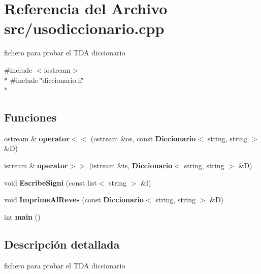 \section{Referencia del Archivo src/usodiccionario.cpp}
\label{usodiccionario_8cpp}


fichero para probar el T\+DA diccionario  


{\ttfamily \#include $<$iostream$>$}\\*
{\ttfamily \#include \char`\"{}diccionario.\+h\char`\"{}}\\*
\subsection*{Funciones}
\begin{DoxyCompactItemize}
\item 
ostream \& {\bfseries operator$<$$<$} (ostream \&os, const {\bf Diccionario}$<$ string, string $>$ \&D)\label{usodiccionario_8cpp_a2df23b649675001c9287783c5ba5de7f}

\item 
istream \& {\bfseries operator$>$$>$} (istream \&is, {\bf Diccionario}$<$ string, string $>$ \&D)\label{usodiccionario_8cpp_ad641af7266310b3ad1491ba4268cbb79}

\item 
void {\bfseries Escribe\+Signi} (const list$<$ string $>$ \&l)\label{usodiccionario_8cpp_a44e0200532574c958f7ed23766d7df4a}

\item 
void {\bfseries Imprime\+Al\+Reves} (const {\bf Diccionario}$<$ string, string $>$ \&D)\label{usodiccionario_8cpp_ab7d7f4f2aa74644a69d214b42affca0a}

\item 
int {\bfseries main} ()\label{usodiccionario_8cpp_ae66f6b31b5ad750f1fe042a706a4e3d4}

\end{DoxyCompactItemize}


\subsection{Descripción detallada}
fichero para probar el T\+DA diccionario 

